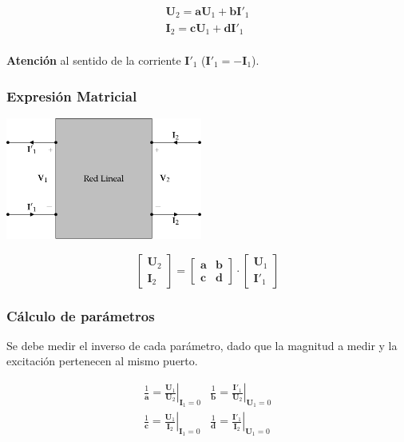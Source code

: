 \[
\begin{array}{l}
  \mathbf{U}_2 = \mathbf{a} \mathbf{U}_1 + \mathbf{b}\mathbf{I'}_1\\
  \mathbf{I}_2 = \mathbf{c} \mathbf{U}_1 + \mathbf{d} \mathbf{I'}_1\\
\end{array}
\]


\textbf{Atención} al sentido de la corriente \(\mathbf{I'}_1\) (\(\mathbf{I'}_1 = - \mathbf{I}_1\)).


\subsubsection{Expresión Matricial}
\label{sec:orgca7fb03}

\includegraphics[height=4cm]{../figs/cuadripolo_transmision_inversa.pdf}


\[
  \left[
    \begin{array}{c}
      \mathbf{U}_2\\
      \mathbf{I}_2
    \end{array}
  \right] =
  \left[
    \begin{array}{cc}
      \mathbf{a} & \mathbf{b}\\
      \mathbf{c} & \mathbf{d}
    \end{array}
  \right] \cdot
  \left[
    \begin{array}{c}
      \mathbf{U}_1\\
      \mathbf{I'}_1
    \end{array}
  \right]
\]

\subsubsection{Cálculo de parámetros}
\label{sec:org67b01c0}
Se debe medir el inverso de cada parámetro, dado que la magnitud a medir y la excitación pertenecen al mismo puerto.

\renewcommand{\arraystretch}{3}
\[
  \begin{array}{cc}
    \frac{1}{\mathbf{a}} = \left.\frac{\mathbf{U}_1}{\mathbf{U}_2}\right\rvert_{\mathbf{I}_1 = 0} &
    \frac{1}{\mathbf{b}} = \left.\frac{\mathbf{I'}_1}{\mathbf{U}_2}\right\rvert_{\mathbf{U}_1 = 0}\\
    \frac{1}{\mathbf{c}} = \left.\frac{\mathbf{U}_1}{\mathbf{I}_2}\right\rvert_{\mathbf{I}_1 = 0} &
    \frac{1}{\mathbf{d}} = \left.\frac{\mathbf{I'}_1}{\mathbf{I}_2}\right\rvert_{\mathbf{U}_1 = 0}\\
  \end{array}
\]

